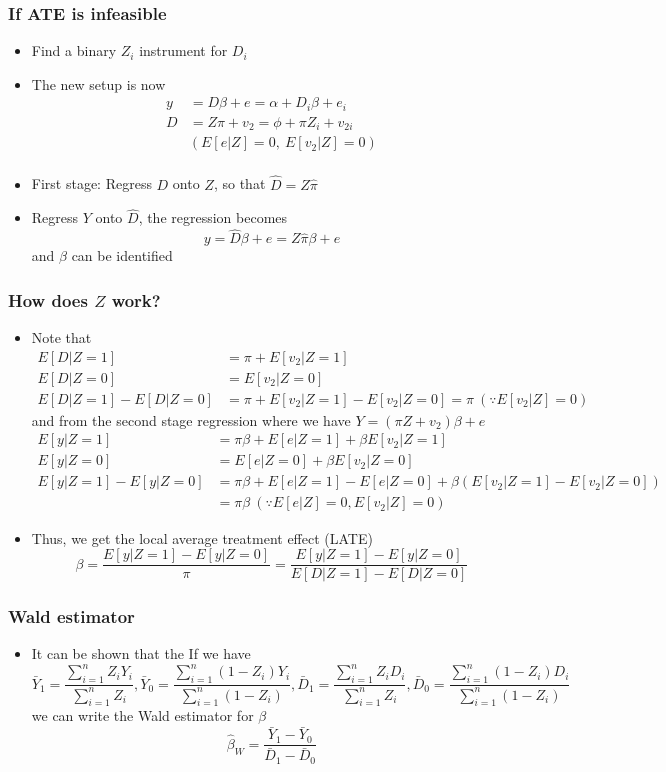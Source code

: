 \documentclass[aspectratio=169]{beamer}
\begin{document}
\begin{frame}
\frametitle{If ATE is infeasible}
\begin{itemize}
\item  Find a binary $Z_i$ instrument for $D_i$
\item The new setup is now
\[
\begin{aligned}
y&=D\beta +e = \alpha+D_i\beta+e_i \\
D&= Z\pi+v_2=\phi+\pi Z_i+v_{2i}\\
&(E[e|Z]=0,\ E[v_{2}|Z]=0)\\
\end{aligned}
\]
\item First stage: Regress $D$ onto $Z$, so that $\widehat{D}=Z\widehat{\pi}$
\item Regress $Y$ onto $\widehat{D}$, the regression becomes
\[
y=\widehat{D}\beta+e = Z\widehat{\pi}\beta+e
\]
and $\beta$ can be identified
\end{itemize}
\end{frame}

\begin{frame}
\frametitle{How does $Z$ work?}
\begin{itemize}
\item Note that
\[
\begin{aligned}
E[D|Z=1]&=\pi+E[v_{2}|Z=1]\\
E[D|Z=0]&=E[v_{2}|Z=0]\\
E[D|Z=1]-E[D|Z=0]&=\pi+E[v_{2}|Z=1]-E[v_{2}|Z=0]=\pi \ (\because E[v_{2}|Z]=0)
\end{aligned}
\]
and from the second stage regression where we have $Y=(\pi Z+v_2)\beta+e$
\[
\begin{aligned}
E[y|Z=1]&=\pi\beta+E[e|Z=1]+\beta E[v_2|Z=1]\\
E[y|Z=0]&=E[e|Z=0]+\beta E[v_2|Z=0]\\
E[y|Z=1]-E[y|Z=0]&=\pi\beta+E[e|Z=1]-E[e|Z=0] + \beta(E[v_2|Z=1]-E[v_2|Z=0])\\
&=\pi\beta \ (\because E[e|Z]=0, E[v_{2}|Z]=0)
\end{aligned}
\]
\item Thus, we get the local average treatment effect (LATE)
\[
\beta = \frac{E[y|Z=1]-E[y|Z=0]}{\pi} = \frac{E[y|Z=1]-E[y|Z=0]}{E[D|Z=1]-E[D|Z=0]}
\]
\end{itemize}
\end{frame}

\begin{frame}
\frametitle{Wald estimator}
\begin{itemize}
\item  It can be shown that the If we have
\[
\bar{Y}_1 = \frac{\sum_{i=1}^n Z_iY_i}{\sum_{i=1}^n Z_i}, \bar{Y}_0 = \frac{\sum_{i=1}^n(1- Z_i)Y_i}{\sum_{i=1}^n (1-Z_i)}, 
\bar{D}_1 = \frac{\sum_{i=1}^n Z_iD_i}{\sum_{i=1}^n Z_i}, \bar{D}_0 = \frac{\sum_{i=1}^n(1- Z_i)D_i}{\sum_{i=1}^n (1-Z_i)}
\]
we can write the Wald estimator for $\beta$
\[
\hat{\beta}_W=\frac{\bar{Y}_1-\bar{Y}_0}{\bar{D}_1-\bar{D}_0}
\]
\end{itemize}
\end{frame}
\end{document}
